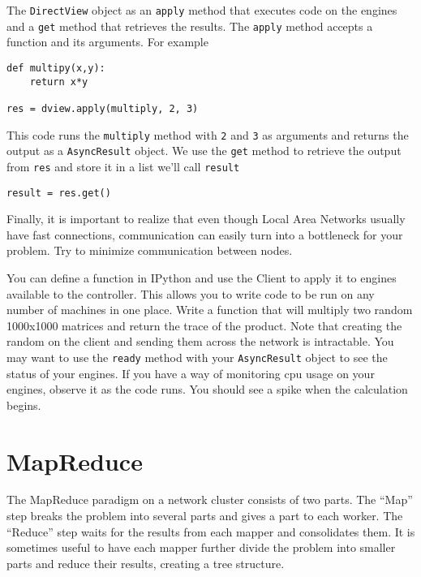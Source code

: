 The {\tt DirectView} object as an {\tt apply} method that executes code on the engines and a {\tt get} method that retrieves the results.
The {\tt apply} method accepts a function and its arguments.
For example

\begin{lstlisting}
def multipy(x,y):
	return x*y

res = dview.apply(multiply, 2, 3)
\end{lstlisting}

This code runs the {\tt multiply} method with {\tt 2} and {\tt 3} as arguments and returns the output as a {\tt AsyncResult} object.
We use the {\tt get} method to retrieve the output from {\tt res} and store it in a list we'll call {\tt result}

\begin{lstlisting}
result = res.get()
\end{lstlisting}

Finally, it is important to realize that even though Local Area Networks usually have fast connections, communication can easily turn into a bottleneck for your problem.
Try to minimize communication between nodes.

\begin{problem}
You can define a function in IPython and use the Client to apply it to engines available to the controller.
This allows you to write code to be run on any number of machines in one place.
Write a function that will multiply two random 1000x1000 matrices and return the trace of the product.
Note that creating the random on the client and sending them across the network is intractable.
You may want to use the {\tt ready} method with your {\tt AsyncResult} object to see the status of your engines.
If you have a way of monitoring cpu usage on your engines, observe it as the code runs.  You should see a spike when the calculation begins.
\end{problem}

\section{MapReduce}

The MapReduce paradigm on a network cluster consists of two parts.
The ``Map'' step breaks the problem into several parts and gives a part to each worker. 
The ``Reduce'' step waits for the results from each mapper and consolidates them.
It is sometimes useful to have each mapper further divide the problem into smaller parts and reduce their results, creating a tree structure.

